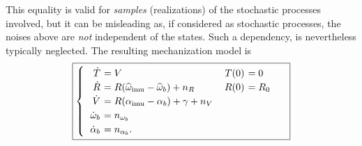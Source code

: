 This equality is valid for {\em samples} (realizations) of the stochastic processes involved, but it can be misleading as, if considered as stochastic processes, the noises above are {\em not} independent of the states. Such a dependency, is nevertheless typically neglected. The resulting mechanization model is
\begin{equation}
\boxed{
\begin{cases}
\begin{tabular}{>{$}r<{$} >{$\!\!\!\!\!}l<{$} >{$}r<{$} >{$\!\!\!\!\!}l<{$}}
\dot T &= V &T(0) &= 0 \\
\dot R &= R (\widehat \w\imu  - \widehat \w_b) + n_{R} &R(0) &= R_0\\
\dot V &= R(\alpha\imu  - \alpha_b) + \gamma + n_V \\ %
\dot \w_b &= n_{\w_b} \\
\dot \alpha_b &= n_{\alpha_b}. 
\end{tabular}
\end{cases}
}
\label{eq-mech}
\end{equation}
